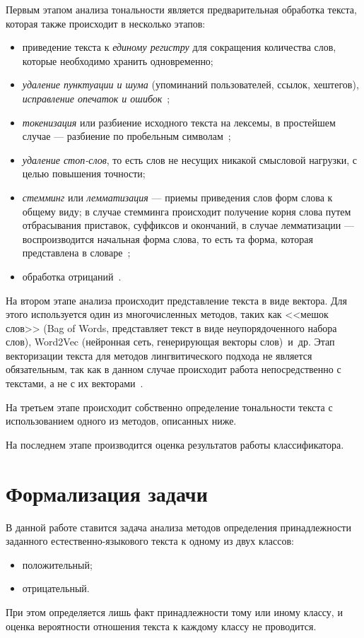 Первым этапом анализа тональности является предварительная обработка текста,
которая также происходит в несколько этапов:
\begin{itemize}
    \item приведение текста к \textit{единому регистру} для сокращения
        количества слов, которые необходимо хранить одновременно;
    \item \textit{удаление пунктуации и шума} (упоминаний пользователей, ссылок,
        хештегов), \textit{исправление опечаток и ошибок}~\cite{article06};
    \item \textit{токенизация} или разбиение исходного текста на лексемы, в простейшем
        случае --- разбиение по пробельным символам~\cite{article07};
    \item \textit{удаление стоп-слов}, то есть слов не несущих никакой смысловой
        нагрузки, с целью повышения точности;
    \item \textit{стемминг} или \textit{лемматизация} --- приемы приведения слов
        форм слова к общему виду; в случае стемминга происходит получение корня
        слова путем отбрасывания приставок, суффиксов и окончаний, в случае
        лемматизации --- воспроизводится начальная форма слова, то есть та форма,
        которая представлена в словаре~\cite{article06};
    \item обработка отрицаний~\cite{article08}.
\end{itemize}

На втором этапе анализа происходит представление текста в виде вектора. Для
этого используется один из многочисленных методов, таких как <<мешок слов>> (Bag
of Words, представляет текст в виде неупорядоченного набора слов), Word2Vec
(нейронная сеть, генерирующая векторы слов)~и~др. Этап векторизации текста для
методов лингвитического подхода не является обязательным, так как в данном
случае происходит работа непосредственно с текстами, а не с их
векторами~\cite{article09}.

На третьем этапе происходит собственно определение тональности текста с
использованием одного из методов, описанных ниже.

На последнем этапе производится оценка результатов работы классификатора.

\section{Формализация задачи}

В данной работе ставится задача анализа методов определения принадлежности
заданного естественно-языкового текста к одному из двух классов:
\begin{itemize}
    \item положительный;
    \item отрицательный.
\end{itemize}

При этом определяется лишь факт принадлежности тому или иному классу, и оценка
вероятности отношения текста к каждому классу не проводится.

